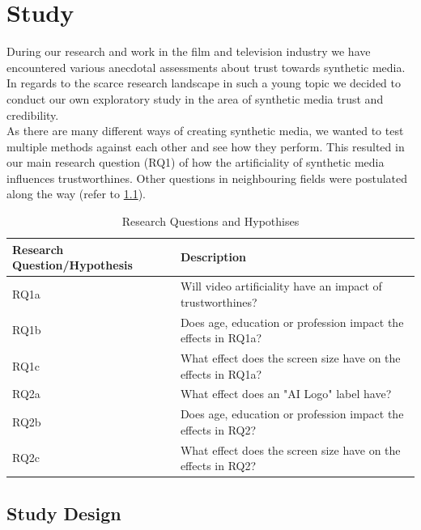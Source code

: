 \documentclass[
  a4paper,  %
  twoside,  %
  bibliography=totoc,
  headsepline,
  cleardoublepage=empty,
  parskip=half,
  draft=false
]{scrbook}
\begin{document}
\chapter{Study}
\label{chap:study}
During our research and work in the film and television industry we have encountered various anecdotal assessments about trust towards synthetic media. In regards to the scarce research landscape in such a young topic we decided to conduct our own exploratory study in the area of synthetic media trust and credibility. \\
As there are many different ways of creating synthetic media, we wanted to test multiple methods against each other and see how they perform. This resulted in our main research question (RQ1) of how the artificiality of synthetic media influences trustworthines. Other questions in neighbouring fields were postulated along the way (refer to \ref{tab:research-questions}).

\begin{table}[h]
  \centering
  \begin{tabularx}{\textwidth}{l|X}
    \textbf{Research Question/Hypothesis} & \textbf{Description}\\
    \midrule
    RQ1a & Will video artificiality have an impact of trustworthines?  \\
    \midrule
    RQ1b & Does age, education or profession impact the effects in RQ1a?  \\
    \midrule
    RQ1c & What effect does the screen size have on the effects in RQ1a?  \\
    \midrule
    RQ2a & What effect does an "AI Logo" label have?\\
    \midrule
    RQ2b & Does age, education or profession impact the effects in RQ2?  \\
    \midrule
    RQ2c & What effect does the screen size have on the effects in RQ2?  \\
  \end{tabularx}
  \caption{Research Questions and Hypothises}
  \label{tab:research-questions}
\end{table}

\section{Study Design}
\label{sec:study design}
\end{document}
